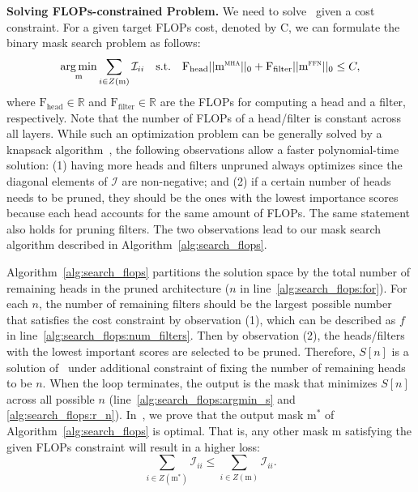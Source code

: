 \textbf{Solving FLOPs-constrained Problem.}
We need to solve~ given a cost constraint.
For a given target FLOPs cost, denoted by C, we can formulate the binary mask search problem as follows:
\begin{gather}
    \operatorname*{arg\,min}_{\text{m}} \sum_{i \in Z(\text{m})} \mathcal{I}_{ii} \quad
    \text{s.t.} \quad \text{F}_{\text{head}} || \text{m}^{\textsc{mha}} ||_0 + \text{F}_{\text{filter}} || \text{m}^{\textsc{ffn}} ||_0 \leq C \label{eq:flops_objective},
\end{gather}
where $\text{F}_\text{head} \in \mathbb{R}$ and $\text{F}_\text{filter} \in \mathbb{R}$  are the FLOPs for computing a head and a filter, respectively.
Note that the number of FLOPs of a head/filter is constant across all layers.
While such an optimization problem can be generally solved by a knapsack algorithm~\cite{aflalo2020knapsack, shen2021halp}, the following observations allow a faster polynomial-time solution:
(1) having more heads and filters unpruned always optimizes  since the diagonal elements of $\mathcal{I}$ are non-negative; and
(2) if a certain number of heads needs to be pruned, they should be the ones with the lowest importance scores because each head accounts for the same amount of FLOPs.
The same statement also holds for pruning filters.
The two observations lead to our mask search algorithm described in Algorithm~\ref{alg:search_flops}.

Algorithm~\ref{alg:search_flops} partitions the solution space by the total number of remaining heads in the pruned architecture ($n$ in line~\ref{alg:search_flops:for}).
For each $n$, the number of remaining filters should be the largest possible number that satisfies the cost constraint by observation (1), which can be described as $f$ in line~\ref{alg:search_flops:num_filters}.
Then by observation (2), the heads/filters with the lowest important scores are selected to be pruned. 
Therefore, $S[n]$ is a solution of~ under additional constraint of fixing the number of remaining heads to be $n$.
When the loop terminates, 
the output is the mask that minimizes $S[n]$ across all possible $n$ (line~\ref{alg:search_flops:argmin_s} and \ref{alg:search_flops:r_n}).
In~, we prove that
the output mask $\text{m}^\ast$ of Algorithm~\ref{alg:search_flops} is optimal.
That is, any other mask $\text{m}$ satisfying the given FLOPs constraint will result in a higher loss:
\begin{equation}
\label{eqn:from_theorem:optimal_mask}
   \sum_{i \in Z(\text{m}^\ast)} \mathcal{I}_{ii} \leq \sum_{i \in Z(\text{m})} \mathcal{I}_{ii}.
\end{equation}

